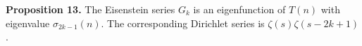 \textbf{Proposition 13.} The Eisenstein series $G_k$ is an eigenfunction of $T(n)$ with eigenvalue $\sigma_{2k-1}(n)$. The corresponding Dirichlet series is $\zeta(s)\zeta(s-2k+1)$.
